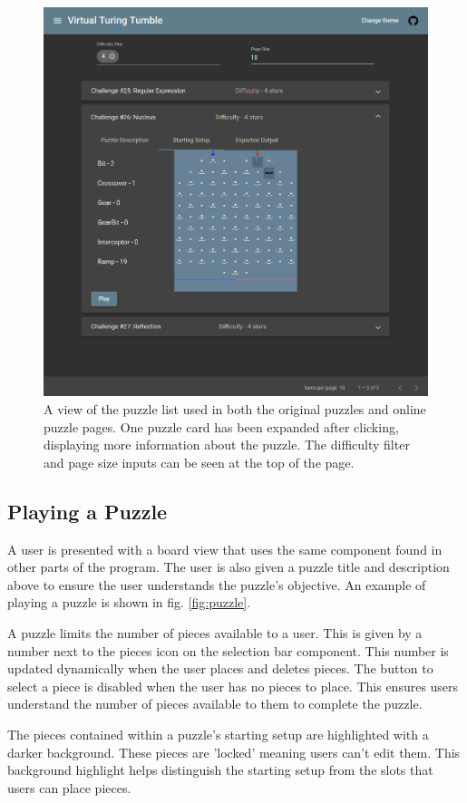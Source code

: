 \documentclass{l4proj}
\begin{document}
\begin{figure}
    \centering
    \includegraphics[width=0.65\linewidth]{images/puzzleList.png}
    \caption{A view of the puzzle list used in both the original puzzles and online puzzle pages. One puzzle card has been expanded after clicking, displaying more information about the puzzle. The difficulty filter and page size inputs can be seen at the top of the page.}
    \label{fig:puzzleList}
\end{figure}

\subsection{Playing a Puzzle}
A user is presented with a board view that uses the same component found in other parts of the program. The user is also given a puzzle title and description above to ensure the user understands the puzzle's objective. An example of playing a puzzle is shown in fig. \ref{fig:puzzle}.

A puzzle limits the number of pieces available to a user. This is given by a number next to the pieces icon on the selection bar component. This number is updated dynamically when the user places and deletes pieces. The button to select a piece is disabled when the user has no pieces to place. This ensures users understand the number of pieces available to them to complete the puzzle. 

The pieces contained within a puzzle's starting setup are highlighted with a darker background. These pieces are 'locked' meaning users can't edit them. This background highlight helps distinguish the starting setup from the slots that users can place pieces. 
\end{document}
